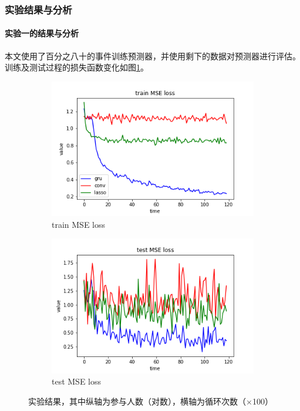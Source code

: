\subsubsection{实验结果与分析}
\paragraph{实验一的结果与分析}
本文使用了百分之八十的事件训练预测器，并使用剩下的数据对预测器进行评估。训练及测试过程的损失函数变化如图\ref{f2-4}。
\begin{figure}[htb]
	\centering
	\begin{subfigure}{.49\textwidth}
		\includegraphics[width=\textwidth]{trainloss.png}
		\caption{train MSE loss}
	\end{subfigure}
	\begin{subfigure}{.49\textwidth}
		\includegraphics[width=\textwidth]{testloss.png}
		\caption{test MSE loss}
	\end{subfigure}
    \caption{实验结果，其中纵轴为参与人数（对数），横轴为循环次数（×100）}
    \label{f2-4}
\end{figure} 
